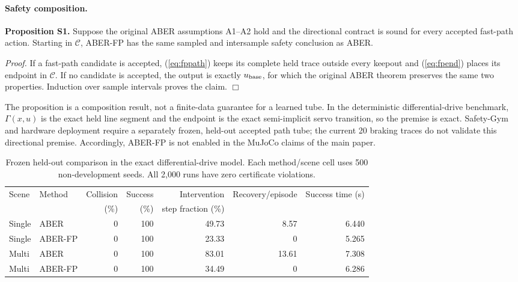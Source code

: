 \paragraph{Safety composition.}
\textbf{Proposition S1.}  Suppose the original ABER assumptions A1--A2 hold
and the directional contract is sound for every accepted fast-path action.
Starting in $\mathcal C$, ABER-FP has the same sampled and intersample safety
conclusion as ABER.

\emph{Proof.}
If a fast-path candidate is accepted, (\ref{eq:fppath}) keeps its complete
held trace outside every keepout and (\ref{eq:fpend}) places its endpoint in
$\mathcal C$.  If no candidate is accepted, the output is exactly
$u_{\rm base}$, for which the original ABER theorem preserves the same two
properties.  Induction over sample intervals proves the claim. \hfill$\Box$

The proposition is a composition result, not a finite-data guarantee for a
learned tube.  In the deterministic differential-drive benchmark,
$\Gamma(x,u)$ is the exact held line segment and the endpoint is the exact
semi-implicit servo transition, so the premise is exact.  Safety-Gym and
hardware deployment require a separately frozen, held-out accepted path tube;
the current 20 braking traces do not validate this directional premise.
Accordingly, ABER-FP is not enabled in the MuJoCo claims of the main paper.

\begin{table}[t]
\centering
\small
\setlength{\tabcolsep}{5pt}
\begin{tabular}{llrrrrr}
\toprule
Scene & Method & Collision & Success & Intervention & Recovery/episode
& Success time (s)\\
 & & (\%) & (\%) & step fraction (\%) & & \\
\midrule
Single & ABER    & 0 & 100 & 49.73 & 8.57  & 6.440\\
Single & ABER-FP & 0 & 100 & 23.33 & 0     & 5.265\\
Multi  & ABER    & 0 & 100 & 83.01 & 13.61 & 7.308\\
Multi  & ABER-FP & 0 & 100 & 34.49 & 0     & 6.286\\
\bottomrule
\end{tabular}
\caption{Frozen held-out comparison in the exact differential-drive model.
Each method/scene cell uses 500 non-development seeds.  All 2,000 runs have
zero certificate violations.}
\label{tab:fastpathheldout}
\end{table}

